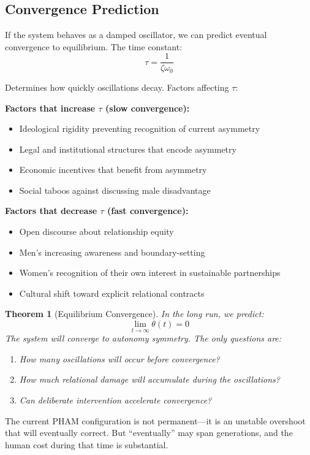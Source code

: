 \documentclass[12pt,openany]{book}
\newtheorem{theorem}{Theorem}[chapter]
\numberwithin{equation}{chapter}
\begin{document}
\subsection{Convergence Prediction}

If the system behaves as a damped oscillator, we can predict eventual convergence to equilibrium. The time constant:
\[
\tau = \frac{1}{\zeta\omega_0}
\]

Determines how quickly oscillations decay. Factors affecting $\tau$:

\textbf{Factors that increase $\tau$ (slow convergence):}
\begin{itemize}
    \item Ideological rigidity preventing recognition of current asymmetry
    \item Legal and institutional structures that encode asymmetry
    \item Economic incentives that benefit from asymmetry
    \item Social taboos against discussing male disadvantage
\end{itemize}

\textbf{Factors that decrease $\tau$ (fast convergence):}
\begin{itemize}
    \item Open discourse about relationship equity
    \item Men's increasing awareness and boundary-setting
    \item Women's recognition of their own interest in sustainable partnerships
    \item Cultural shift toward explicit relational contracts
\end{itemize}

\begin{theorem}[Equilibrium Convergence]
In the long run, we predict:
\[
\lim_{t \to \infty} \theta(t) = 0
\]
The system will converge to autonomy symmetry. The only questions are:
\begin{enumerate}
    \item How many oscillations will occur before convergence?
    \item How much relational damage will accumulate during the oscillations?
    \item Can deliberate intervention accelerate convergence?
\end{enumerate}
\end{theorem}

The current PHAM configuration is not permanent---it is an unstable overshoot that will eventually correct. But ``eventually'' may span generations, and the human cost during that time is substantial.
\end{document}
